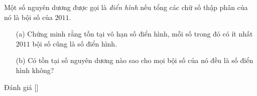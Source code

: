 \ifshowproblem
\begin{problem}\label{problem:ROU-2015-MO-8-P4}
    Một số nguyên dương được gọi là \textit{điển hình} nếu tổng các chữ số thập phân của nó là bội số của \(2011\).

    \begin{itemize}
        \item[(a)] Chứng minh rằng tồn tại vô hạn số điển hình, mỗi số trong đó có ít nhất \(2011\) bội số cũng là số điển hình.
        \item[(b)] Có tồn tại số nguyên dương nào sao cho mọi bội số của nó đều là số điển hình không?
    \end{itemize}
\end{problem}
\fi

\ifshowinfo
Đánh giá [\textbf{}]
\fi